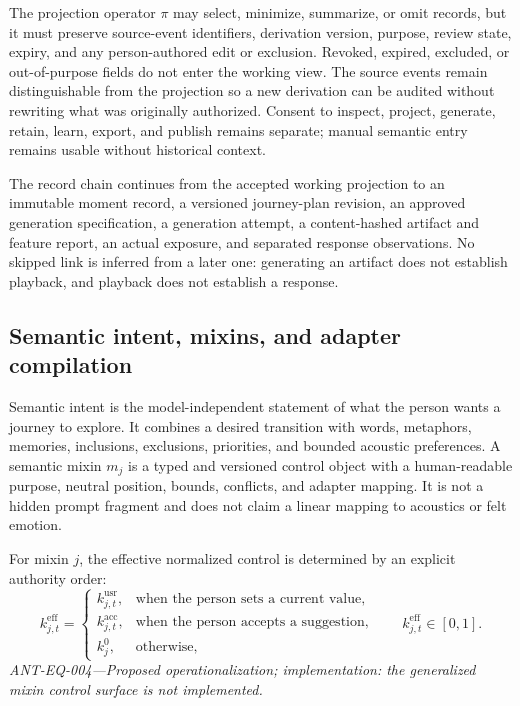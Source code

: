 The projection operator $\pi$ may select, minimize, summarize, or omit records,
but it must preserve source-event identifiers, derivation version, purpose,
review state, expiry, and any person-authored edit or exclusion. Revoked,
expired, excluded, or out-of-purpose fields do not enter the working view. The
source events remain distinguishable from the projection so a new derivation
can be audited without rewriting what was originally authorized. Consent to
inspect, project, generate, retain, learn, export, and publish remains separate;
manual semantic entry remains usable without historical context.

The record chain continues from the accepted working projection to an immutable
moment record, a versioned journey-plan revision, an approved generation
specification, a generation attempt, a content-hashed artifact and feature
report, an actual exposure, and separated response observations. No skipped
link is inferred from a later one: generating an artifact does not establish
playback, and playback does not establish a response.


\subsection{Semantic intent, mixins, and adapter compilation}
\label{sec:design-semantic-intent}

Semantic intent is the model-independent statement of what the person wants a
journey to explore. It combines a desired transition with words, metaphors,
memories, inclusions, exclusions, priorities, and bounded acoustic preferences.
A semantic mixin $m_j$ is a typed and versioned control object with a
human-readable purpose, neutral position, bounds, conflicts, and adapter
mapping. It is not a hidden prompt fragment and does not claim a linear mapping
to acoustics or felt emotion.

For mixin $j$, the effective normalized control is determined by an explicit
authority order:
\begin{equation}
  k^{\mathrm{eff}}_{j,t} =
  \begin{cases}
    k^{\mathrm{usr}}_{j,t}, & \text{when the person sets a current value},\\
    k^{\mathrm{acc}}_{j,t}, & \text{when the person accepts a suggestion},\\
    k^{0}_{j}, & \text{otherwise},
  \end{cases}
  \qquad k^{\mathrm{eff}}_{j,t}\in[0,1].
  \label{eq:effective-knob}
\end{equation}
\noindent\textit{ANT-EQ-004---Proposed operationalization; implementation:
the generalized mixin control surface is not implemented.}

